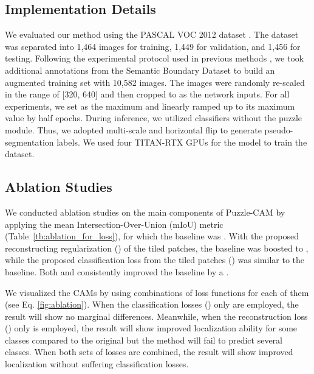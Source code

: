 \documentclass{article}
\begin{document}
\subsection{Implementation Details}
\label{ssec:implementation}





We evaluated our method using the PASCAL VOC 2012 dataset \cite{everingham2010pascal}.
The dataset was separated into 1,464 images for training, 1,449 for validation, and 1,456 for testing. 
Following the experimental protocol used in previous methods \cite{ahn2018learning, Wang_2020_CVPR, lee2019ficklenet}, we took additional annotations from the Semantic Boundary Dataset \cite{hariharan2011semantic} to build an augmented training set with 10,582 images. 
The images were randomly re-scaled in the range of [320, 640] and then cropped to  as the network inputs. 
For all experiments, we set  as the maximum and linearly ramped up  to its maximum value by half epochs.
During inference, we utilized classifiers without the puzzle module.
Thus, we adopted multi-scale and horizontal flip to generate pseudo-segmentation labels.
We used four TITAN-RTX GPUs for the model to train the dataset.






\subsection{Ablation Studies}
\label{ssec:ablation}

We conducted ablation studies on the main components of Puzzle-CAM by applying the mean Intersection-Over-Union (mIoU) metric (Table~\ref{tb:ablation_for_loss}), for which the baseline was . 
With the proposed reconstructing regularization () of the  tiled patches, the baseline was boosted to , while the proposed classification loss from the tiled patches () was similar to the baseline. 
Both  and  consistently improved the baseline by a . 



We visualized the CAMs by using combinations of loss functions for each of them (see Eq. \ref{fig:ablation}).
When the classification losses () only are employed, the result will show no marginal differences.
Meanwhile, when the reconstruction loss () only is employed, the result will show improved localization ability for some classes compared to the original but the method will fail to predict several classes.
When both sets of losses are combined, the result will show improved localization without suffering classification losses.
\end{document}
